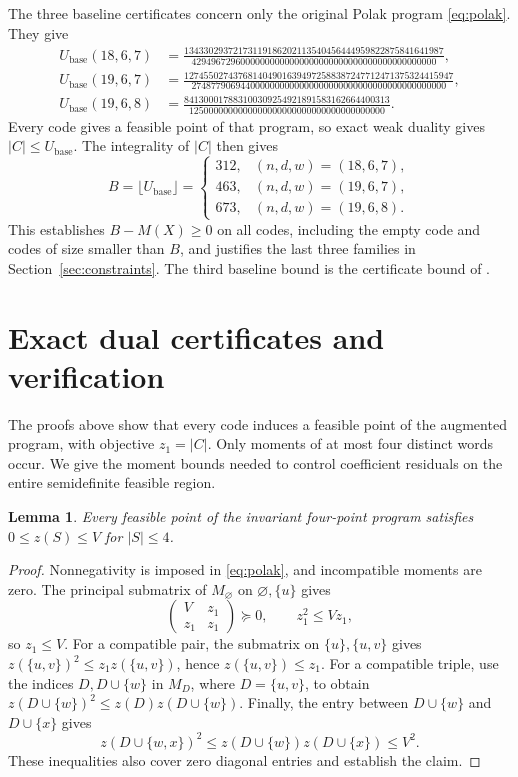 \documentclass[11pt]{article}
\newtheorem{lemma}{Lemma}
\begin{document}
The three baseline certificates concern only the original Polak program
\eqref{eq:polak}. They give
\begin{align*}
 U_{\mathrm{base}}(18,6,7)
 &=\frac{13433029372173119186202113540456444959822875841641987}
 {42949672960000000000000000000000000000000000000000},\\[4pt]
 U_{\mathrm{base}}(19,6,7)
 &=\frac{1274550274376814049016394972588387247712471375324415947}
 {2748779069440000000000000000000000000000000000000000},\\[4pt]
 U_{\mathrm{base}}(19,6,8)
 &=\frac{841300017883100309254921891583162664400313}
 {1250000000000000000000000000000000000000}.
\end{align*}
Every code gives a feasible point of that program, so exact weak duality
gives $|C|\le U_{\mathrm{base}}$. The integrality of $|C|$ then gives
\[
 B=\lfloor U_{\mathrm{base}}\rfloor=
 \begin{cases}
 312,&(n,d,w)=(18,6,7),\\
 463,&(n,d,w)=(19,6,7),\\
 673,&(n,d,w)=(19,6,8).
 \end{cases}
\]
This establishes $B-M(X)\ge0$ on all codes, including the empty code and
codes of size smaller than $B$, and justifies the last three families in
Section~\ref{sec:constraints}. The third baseline bound is the certificate
bound of \cite{Chang}.

\section{Exact dual certificates and verification}\label{sec:certificates}

The proofs above show that every code induces a feasible point of the
augmented program, with objective $z_1=|C|$. Only moments of at most four
distinct words occur. We give the moment bounds needed to control
coefficient residuals on the entire semidefinite feasible region.

\begin{lemma}\label{lem:box}
Every feasible point of the invariant four-point program satisfies
$0\le z(S)\le V$ for $|S|\le4$.
\end{lemma}
\begin{proof}
Nonnegativity is imposed in \eqref{eq:polak}, and incompatible moments are
zero. The principal submatrix of $M_\varnothing$ on
$\varnothing,\{u\}$ gives
\[
 \begin{pmatrix}V&z_1\\z_1&z_1\end{pmatrix}\succeq0,
 \qquad z_1^2\le Vz_1,
\]
so $z_1\le V$. For a compatible pair, the submatrix on
$\{u\},\{u,v\}$ gives $z(\{u,v\})^2\le z_1z(\{u,v\})$,
hence $z(\{u,v\})\le z_1$. For a compatible triple, use the indices
$D,D\cup\{w\}$ in $M_D$, where $D=\{u,v\}$, to obtain
$z(D\cup\{w\})^2\le z(D)z(D\cup\{w\})$.
Finally, the entry between $D\cup\{w\}$ and $D\cup\{x\}$ gives
\[
 z(D\cup\{w,x\})^2
 \le z(D\cup\{w\})z(D\cup\{x\})\le V^2.
\]
These inequalities also cover zero diagonal entries and establish the claim.
\end{proof}
\end{document}
